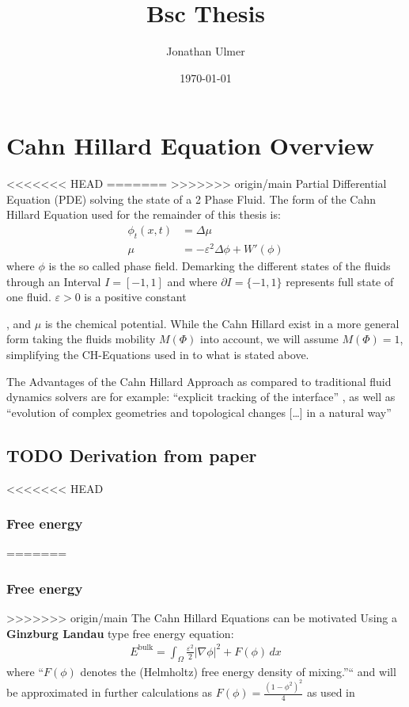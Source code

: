 \documentclass[11pt]{article}
\author{Jonathan Ulmer}
\date{\today}
\title{Bsc Thesis}
\begin{document}
\maketitle
\tableofcontents

\section{Cahn Hillard Equation Overview}
<<<<<<< HEAD
\label{sec:org31147c6}
=======
\label{sec:org8a3c2ff}
>>>>>>> origin/main
Partial Differential Equation (PDE) solving the state of a 2 Phase Fluid\autocite{Wu_2022}. The form of the Cahn Hillard Equation used for the remainder of this thesis is:
\begin{align}
\phi _t(x,t) &=  \Delta  \mu \\
\mu &= - \varepsilon^2 \Delta \phi   + W'(\phi)
\end{align}
where \(\phi\) is the so called phase field. Demarking the different states of the fluids through an Interval \(I=[-1,1]\) and where \(\partial I = \{-1,1\}\)  represents full state of one fluid. \(\varepsilon > 0\) is  a positive constant

, and \(\mu\) is the chemical potential\autocite{Wu_2022}. While the Cahn Hillard exist in a more general form taking the fluids mobility \(M(\Phi)\) into account, we will assume \(M(\Phi) = 1\), simplifying the CH-Equations used in\autocite{Wu_2022}\autocite{SHIN20117441} to what is stated above.


The Advantages of the Cahn Hillard Approach as compared to traditional fluid dynamics solvers are for example: ``explicit tracking of the interface'' \autocite{Wu_2022}, as well as ``evolution of complex geometries and topological changes [\ldots{}] in a natural way'' \autocite{Wu_2022}
\subsection{{\bfseries\sffamily TODO} Derivation from paper}
<<<<<<< HEAD
\label{sec:orge0bc234}
\subsubsection{Free energy}
\label{sec:orgaeb3229}
=======
\label{sec:org52b80ab}
\subsubsection{Free energy}
\label{sec:org8bd12f1}
>>>>>>> origin/main
The Cahn Hillard Equations can be motivated Using a \textbf{Ginzburg Landau} type free energy equation:
\begin{align*}
E^{\text{bulk}}  = \int_{  \Omega}  \frac{\varepsilon^2}{2} |\nabla \phi |^2 + F(\phi) \,dx
\end{align*}
where ``\(F(\phi)\)  denotes the (Helmholtz) free energy density of mixing.''`` \autocite{Wu_2022} and will be approximated in further calculations as \(F(\phi) = \frac{(1-\phi ^2)^2}{4}\) as used in\autocite{SHIN20117441}
\end{document}
